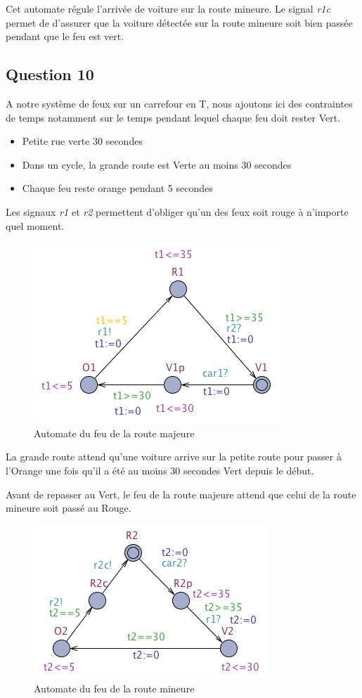 \documentclass[11pt]{article}
\begin{document}
Cet automate régule l'arrivée de voiture sur la route mineure. Le signal \emph{r1c} permet de d'assurer que la voiture détectée sur la route mineure soit bien passée pendant que le feu est vert.

\subsection{Question 10}

A notre système de feux sur un carrefour en T, nous ajoutons ici des contraintes de temps notamment sur le temps pendant lequel chaque feu doit rester Vert.

\begin{itemize}
	\item Petite rue verte 30 secondes
	\item Dans un cycle, la grande route est Verte au moins 30 secondes
	\item Chaque feu reste orange pendant 5 secondes
\end{itemize}

Les signaux \emph{r1} et \emph{r2} permettent d'obliger qu'un des feux soit rouge à n'importe quel moment.

\begin{figure}[H]
	\centering
	\includegraphics{ressources/part3/Q10-1.png}
	\caption{Automate du feu de la route majeure}
\end{figure}

La grande route attend qu'une voiture arrive sur la petite route pour passer à l'Orange une fois qu'il a été au moins 30 secondes Vert depuis le début.

Avant de repasser au Vert, le feu de la route majeure attend que celui de la route mineure soit passé au Rouge.

\begin{figure}[H]
	\centering
	\includegraphics{ressources/part3/Q10-2.png}
	\caption{Automate du feu de la route mineure}
\end{figure}
\end{document}

